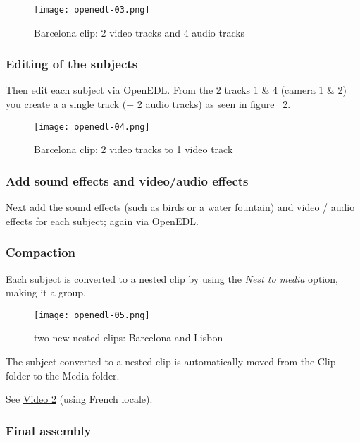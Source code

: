 \begin{figure}[htpb]
	\centering
	\texttt{[image: openedl-03.png]}
	\caption{Barcelona clip: 2 video tracks and 4 audio tracks}
	\label{fig:openedl-03}
\end{figure}

\subsubsection*{Editing of the subjects}
\label{ssub:editing_subjects}

Then edit each subject via OpenEDL. From the 2 tracks 1 \& 4 (camera 1 \& 2) you create a a single track (+ 2 audio tracks) as seen in figure ~\ref{fig:openedl-04}.

\begin{figure}[htpb]
	\centering
	\texttt{[image: openedl-04.png]}
	\caption{Barcelona clip: 2 video tracks to 1 video track}
	\label{fig:openedl-04}
\end{figure}

\subsubsection*{Add sound effects and video/audio effects}
\label{ssub:add_sound_video_effects}

Next add the sound effects (such as birds or a water fountain) and video / audio effects for each subject; again via OpenEDL.

\subsubsection*{Compaction}
\label{ssub:compaction}

Each subject is converted to a nested clip by using the \textit{Nest to media} option, making it a group.

\begin{figure}[htpb]
	\centering
	\texttt{[image: openedl-05.png]}
	\caption{two new nested clips: Barcelona and Lisbon}
	\label{fig:openedl-05}
\end{figure}

The subject converted to a nested clip is automatically moved from the Clip folder to the Media folder.

See \href{https://youtu.be/kQ7sGq0o44U}{Video 2} (using French locale).

\subsubsection*{Final assembly}
\label{ssub:final_assembly}

